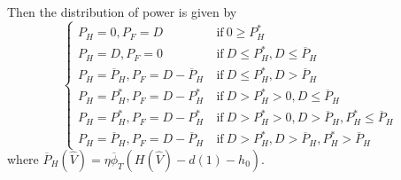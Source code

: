 \documentclass[12pt]{article}
\theoremstyle{definition}
\theoremstyle{remark}
\begin{document}
Then the distribution of power is given by
\begin{equation*}
\begin{cases}
P_H=0,P_F=D\ &\text{if}\ 0\geq P^*_H\\
P_H=D,P_F=0\ &\text{if}\ D\leq P_H^*,D\leq\overline{P}_H\\
P_H=\overline{P}_H,P_F=D-\overline{P}_H\ &\text{if}\ D\leq P_H^*,D>\overline{P}_H\\
P_H=P_H^*,P_F=D-P_H^*\ &\text{if}\ D>P_H^*>0,D\leq\overline{P}_H\\
P_H=P_H^*,P_F=D-P_H^*\ &\text{if}\ D>P_H^*>0,D>\overline{P}_H,P_H^*\leq\overline{P}_H\\
P_H=\overline{P}_H,P_F=D-\overline{P}_H\ &\text{if}\ D>P_H^*,D>\overline{P}_H,P_H^*>\overline{P}_H
\end{cases}
\end{equation*}
where $\overline{P}_H(\hat{V})=\eta\overline{\phi}_T(H(\hat{V})-d(1)-h_0)$.
\end{document}
